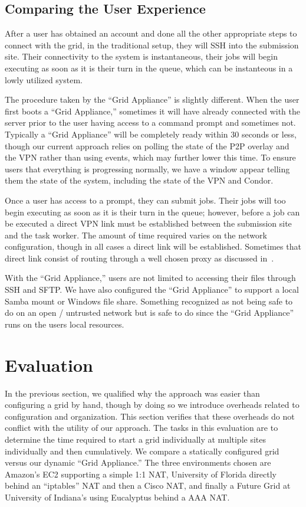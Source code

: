 \documentclass[conference]{IEEEtran}
\begin{document}
\subsection{Comparing the User Experience}

After a user has obtained an account and done all the other appropriate steps
to connect with the grid, in the traditional setup, they will SSH into the
submission site.  Their connectivity to the system is instantaneous, their jobs
will begin executing as soon as it is their turn in the queue, which can be
instanteous in a lowly utilized system.

The procedure taken by the ``Grid Appliance'' is slightly different.  When the
user first boots a ``Grid Appliance,'' sometimes it will have already connected
with the server prior to the user having access to a command prompt and
sometimes not.  Typically a ``Grid Appliance'' will be completely ready within
30 seconds or less, though our current approach relies on polling the state of
the P2P overlay and the VPN rather than using events, which may further lower
this time.  To ensure users that everything is progressing normally, we have a
window appear telling them the state of the system, including the state of the
VPN and Condor.

Once a user has access to a prompt, they can submit jobs.  Their jobs will too
begin executing as soon as it is their turn in the queue; however, before a job
can be executed a direct VPN link must be established between the submission
site and the task worker.  The amount of time required varies on the network
configuration, though in all cases a direct link will be established.
Sometimes that direct link consist of routing through a well chosen proxy as
discussed in~\cite{collaboratecom}.

With the ``Grid Appliance,'' users are not limited to accessing their files
through SSH and SFTP.  We have also configured the ``Grid Appliance'' to
support a local Samba mount or Windows file share.  Something recognized as not
being safe to do on an open / untrusted network but is safe to do since the
``Grid Appliance'' runs on the users local resources.

\section{Evaluation}
\label{evaluation}

In the previous section, we qualified why the approach was easier than
configuring a grid by hand, though by doing so we introduce overheads related
to configuration and organization.  This section verifies that these overheads
do not conflict with the utility of our approach.  The tasks in this evaluation
are to determine the time required to start a grid individually at multiple
sites individually and then cumulatively.  We compare a statically configured
grid versus our dynamic ``Grid Appliance.''  The three environments chosen are
Amazon's EC2 supporting a simple 1:1 NAT, University of Florida directly behind
an ``iptables'' NAT and then a Cisco NAT, and finally a Future Grid at
University of Indiana's using Eucalyptus behind a AAA NAT.
\end{document}
